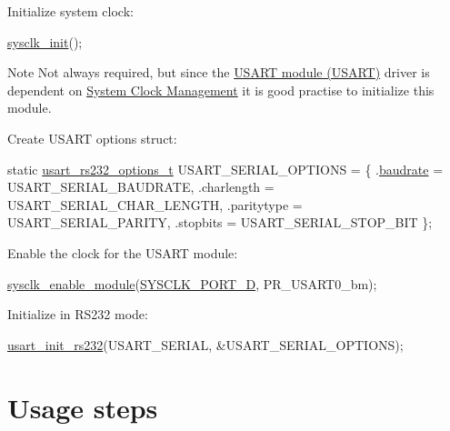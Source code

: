 \begin{DoxyEnumerate}
\item Initialize system clock\-:
\begin{DoxyItemize}
\item 
\begin{DoxyCode}
 \hyperlink{group__sysclk__group_ga242399e48a97739c88b4d0c00f6101de}{sysclk\_init}(); 
\end{DoxyCode}

\item \begin{DoxyNote}{Note}
Not always required, but since the \hyperlink{group__usart__group}{U\-S\-A\-R\-T module (U\-S\-A\-R\-T)} driver is dependent on \hyperlink{group__sysclk__group}{System Clock Management} it is good practise to initialize this module.
\end{DoxyNote}

\end{DoxyItemize}
\item Create U\-S\-A\-R\-T options struct\-:
\begin{DoxyItemize}
\item 
\begin{DoxyCode}
        \textcolor{keyword}{static} \hyperlink{structusart__rs232__options}{usart\_rs232\_options\_t} USART\_SERIAL\_OPTIONS 
      = \{
           .\hyperlink{structusart__rs232__options_a2c48c35d680d4805d357677d7d352fd0}{baudrate} = USART\_SERIAL\_BAUDRATE,
           .charlength = USART\_SERIAL\_CHAR\_LENGTH,
           .paritytype = USART\_SERIAL\_PARITY,
           .stopbits = USART\_SERIAL\_STOP\_BIT
        \};
\end{DoxyCode}

\end{DoxyItemize}
\item Enable the clock for the U\-S\-A\-R\-T module\-:
\begin{DoxyItemize}
\item 
\begin{DoxyCode}
 \hyperlink{group__sysclk__group_gac31edbbb1296f1eb737401b7b2b4e352}{sysclk\_enable\_module}(\hyperlink{group__sysclk__group_gga8e29b46d7670875f4c509efd7a8d5f1aa953a41943eb2d157ee9edcfcd431ce46}{SYSCLK\_PORT\_D}, 
      PR\_USART0\_bm); 
\end{DoxyCode}

\end{DoxyItemize}
\item Initialize in R\-S232 mode\-:
\begin{DoxyItemize}
\item 
\begin{DoxyCode}
 \hyperlink{group__usart__group_ga507caac3c2c003461cd6ded584af984d}{usart\_init\_rs232}(USART\_SERIAL, &USART\_SERIAL\_OPTIONS);
\end{DoxyCode}

\end{DoxyItemize}
\end{DoxyEnumerate}\hypertarget{xmega_usart_quickstart_usart_basic_use_case_usage}{}\section{Usage steps}\label{xmega_usart_quickstart_usart_basic_use_case_usage}
